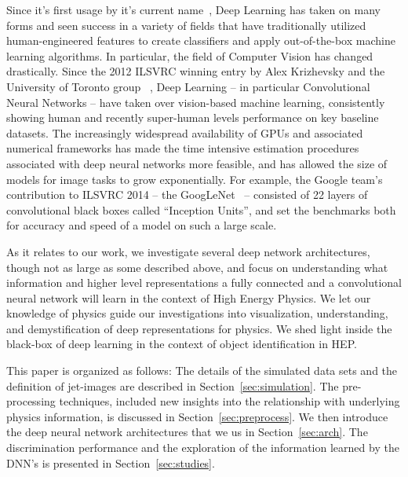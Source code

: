 \documentclass{article}
\begin{document}
Since it's first usage by it's current name~\cite{hinton06}, Deep Learning has taken on many forms and seen success in a variety of fields that have traditionally utilized human-engineered features to create classifiers and apply out-of-the-box machine learning algorithms. In particular, the field of Computer Vision has changed drastically. Since the 2012 ILSVRC winning entry by Alex Krizhevsky and the University of Toronto group ~\cite{alexnet}, Deep Learning -- in particular Convolutional Neural Networks -- have taken over vision-based machine learning, consistently showing human and recently super-human levels performance on key baseline datasets. The increasingly widespread availability of GPUs and associated numerical frameworks has made the time intensive estimation procedures associated with deep neural networks more feasible, and has allowed the size of models for image tasks to grow exponentially. For example, the Google team's contribution to ILSVRC 2014 -- the GoogLeNet~\cite{googlenet} -- consisted of 22 layers of convolutional black boxes called ``Inception Units'', and set the benchmarks both for accuracy and speed of a model on such a large scale. 

As it relates to our work, we investigate several deep network architectures, though not as large as some described above, and focus on  understanding what information and higher level representations a fully connected and a convolutional neural network will learn in the context of High Energy Physics. We let our knowledge of physics guide our investigations into visualization, understanding, and demystification of deep representations for physics. We shed light inside the black-box of deep learning in the context of object identification in HEP.

This paper is organized as follows:  The details of the simulated data sets and the definition of jet-images are described in Section~\ref{sec:simulation}.    The pre-processing techniques, included new insights into the relationship with underlying physics information, is discussed in Section~\ref{sec:preprocess}.  We then introduce the deep neural network architectures that we us in Section~\ref{sec:arch}.  The discrimination performance and the exploration of the information learned by the DNN's is presented in Section~\ref{sec:studies}.




\end{document}
